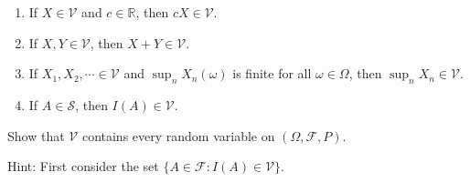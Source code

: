 \documentclass[
  letterpaper,
  DIV=11,
  numbers=noendperiod]{scrreprt}
\theoremstyle{definition}
\theoremstyle{plain}
\theoremstyle{remark}
\begin{document}
\begin{enumerate}
\def\labelenumi{(\roman{enumi})}
\item
  If \(X \in \mathcal{V}\) and \(c \in \mathbb{R}\), then
  \(c X \in \mathcal{V}\).
\item
  If \(X, Y \in \mathcal{V}\), then \(X+Y \in \mathcal{V}\).
\item
  If \(X_{1}, X_{2}, \cdots \in \mathcal{V}\) and
  \(\sup _{n} X_{n}(\omega)\) is finite for all \(\omega \in \Omega\),
  then \(\sup _{n} X_{n} \in \mathcal{V}\).
\item
  If \(A \in \mathcal{S}\), then \(I(A) \in \mathcal{V}\).
\end{enumerate}

Show that \(\mathcal{V}\) contains every random variable on
\((\Omega, \mathcal{F}, P)\).

Hint: First consider the set
\(\{A \in \mathcal{F}: I(A) \in \mathcal{V}\}\).
\end{document}
